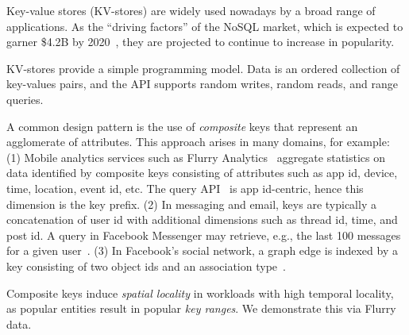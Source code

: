 Key-value stores (KV-stores) are widely used nowadays by a broad range of applications. As the 
``driving factors'' of the NoSQL market, which is expected to garner \$4.2B by 2020~\cite{alliedmarketresearch}, they are projected
to continue to increase in popularity.

KV-stores provide a simple programming model. 
Data is an ordered collection of key-values pairs, and  the API supports random writes, 
random reads, and range queries. 

A common design pattern is the use of \emph{composite} 
keys that represent an agglomerate of attributes.
This approach arises in many domains, for example: 
(1) Mobile analytics services such as Flurry Analytics~\cite{flurry} aggregate statistics 
on data identified by composite keys consisting of attributes such as app id, device, time, location, 
event id, etc. The query API~\cite{flurry-api} is app id-centric, hence this dimension is the key prefix.
(2) In messaging and email, keys are typically a concatenation of user id with additional dimensions 
such as thread id, time, and post id. A query in Facebook Messenger may retrieve, e.g., the last 100 messages for a 
given user~\cite{Borthakur:2011:AHG:1989323.1989438}. %
(3) In Facebook's social network, a graph edge is indexed by a key consisting of two 
object ids and an association type~\cite{Armstrong:2013:LDB:2463676.2465296}.

Composite keys induce \emph{spatial locality} in workloads with high {temporal locality}, as 
popular entities 
result in popular \emph{key ranges}. We demonstrate this via Flurry data. 


